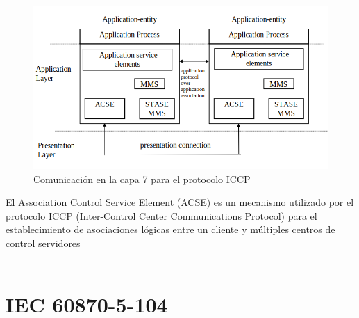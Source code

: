 \documentclass[a5paper]{book}%
\begin{document}
\begin{figure}[H]
  \caption{Comunicación en la capa 7 para el protocolo ICCP}
  \label{fig:capa7iccp}
  \includegraphics[width=\linewidth]{capas_iccp}
\end{figure}


El Association Control Service Element (ACSE) es un mecanismo utilizado por el protocolo ICCP (Inter-Control Center Communications Protocol) para el establecimiento de asociaciones lógicas entre un cliente y múltiples centros de control servidores\\\\
 

\section{ IEC 60870-5-104}
\end{document}
